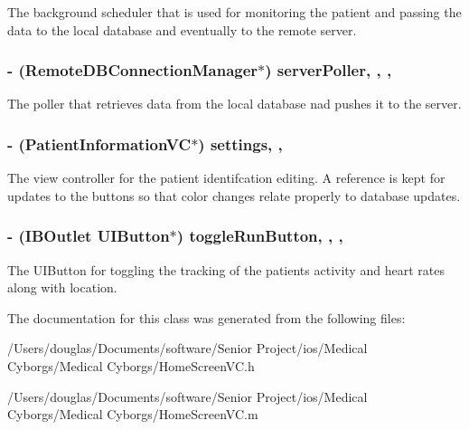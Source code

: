 The background scheduler that is used for monitoring the patient and passing the data to the local database and eventually to the remote server. \hypertarget{interface_home_screen_v_c_acf743bf5899a89cff1321f785b9a48e5}{
\subsubsection[{server\-Poller}]{\setlength{\rightskip}{0pt plus 5cm}-\/ ({\bf Remote\-D\-B\-Connection\-Manager}$\ast$) server\-Poller\hspace{0.3cm}{\ttfamily [read]}, {\ttfamily [write]}, {\ttfamily [atomic]}, {\ttfamily [retain]}}}\label{interface_home_screen_v_c_acf743bf5899a89cff1321f785b9a48e5}
The poller that retrieves data from the local database nad pushes it to the server. \hypertarget{interface_home_screen_v_c_a89f03faa7fe6fba12a8d17dead120a0c}{
\subsubsection[{settings}]{\setlength{\rightskip}{0pt plus 5cm}-\/ ({\bf Patient\-Information\-V\-C}$\ast$) settings\hspace{0.3cm}{\ttfamily [read]}, {\ttfamily [write]}, {\ttfamily [atomic]}}}\label{interface_home_screen_v_c_a89f03faa7fe6fba12a8d17dead120a0c}
The view controller for the patient identifcation editing. A reference is kept for updates to the buttons so that color changes relate properly to database updates. \hypertarget{interface_home_screen_v_c_aad6f8311d7f241d28c255af76fea1c4b}{
\subsubsection[{toggle\-Run\-Button}]{\setlength{\rightskip}{0pt plus 5cm}-\/ (I\-B\-Outlet U\-I\-Button$\ast$) toggle\-Run\-Button\hspace{0.3cm}{\ttfamily [read]}, {\ttfamily [write]}, {\ttfamily [nonatomic]}, {\ttfamily [retain]}}}\label{interface_home_screen_v_c_aad6f8311d7f241d28c255af76fea1c4b}
The U\-I\-Button for toggling the tracking of the patients activity and heart rates along with location. 

The documentation for this class was generated from the following files\-:\begin{DoxyCompactItemize}
\item 
/\-Users/douglas/\-Documents/software/\-Senior Project/ios/\-Medical Cyborgs/\-Medical Cyborgs/Home\-Screen\-V\-C.\-h\item 
/\-Users/douglas/\-Documents/software/\-Senior Project/ios/\-Medical Cyborgs/\-Medical Cyborgs/Home\-Screen\-V\-C.\-m\end{DoxyCompactItemize}

